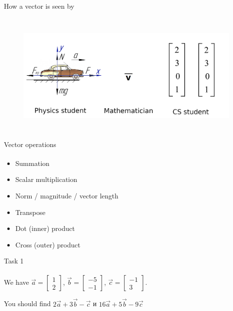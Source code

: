 \documentclass[aspectratio=169,notes]{beamer}
\begin{document}
\begin{frame}[t]{How a vector is seen by}
    \framesubtitle{}
    \vspace{-0.6cm}
    \begin{figure}[H]
        \centering\includegraphics[height=6cm,width=1\textwidth,keepaspectratio]{resources/Vector_representation.png}
        \label{fig:file_name}
    \end{figure}
\end{frame}

\begin{frame}[t]{Vector operations}
    \framesubtitle{}
    \begin{itemize}
        \item Summation
        \item Scalar multiplication
        \item Norm / magnitude / vector length
        \item Transpose
        \item Dot (inner) product
        \item Cross (outer) product
    \end{itemize}
\end{frame}

\begin{frame}[t]{Task 1}
    \framesubtitle{}
    We have $\vec{a} = \begin{bmatrix}
            1 \\ 2
        \end{bmatrix}$, $\vec{b} = \begin{bmatrix}
            -5 \\ -1
        \end{bmatrix}$, $\vec{c} = \begin{bmatrix}
            -1 \\ 3
        \end{bmatrix}$.
    \medskip

    You should find $2\vec{a} + 3\vec{b} - \vec{c}$ и $16\vec{a} + 5\vec{b} - 9\vec{c}$
\end{frame}
\end{document}
